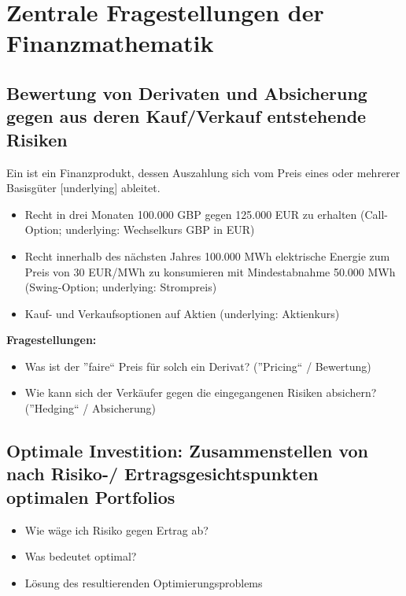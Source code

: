 \section{Zentrale Fragestellungen der Finanzmathematik}

\subsection{Bewertung von Derivaten und Absicherung gegen aus deren Kauf/Verkauf entstehende Risiken}

\begin{definition}[Derivat]
	Ein  ist ein Finanzprodukt, dessen Auszahlung sich vom Preis eines oder mehrerer Basisgüter [underlying] ableitet.
\end{definition}

\begin{beispiel}
	\begin{itemize}[nolistsep, leftmargin=*, topsep=-\parskip]
		\item Recht in drei Monaten 100.000 GBP gegen 125.000 EUR zu erhalten (Call-Option; underlying: Wechselkurs GBP in EUR)
		\item Recht innerhalb des nächsten Jahres 100.000 MWh elektrische Energie zum Preis von 30 EUR/MWh zu konsumieren mit Mindestabnahme 50.000 MWh (Swing-Option; underlying: Strompreis)
		\item Kauf- und Verkaufsoptionen auf Aktien (underlying: Aktienkurs)
	\end{itemize}
\end{beispiel}

\textbf{Fragestellungen:}
\begin{itemize}[nolistsep, label=--, topsep=-\parskip]
	\item Was ist der ''faire`` Preis für solch ein Derivat? (''Pricing`` / Bewertung)
	\item Wie kann sich der Verkäufer gegen die eingegangenen Risiken absichern? (''Hedging`` / Absicherung)
\end{itemize}

\subsection{Optimale Investition: Zusammenstellen von nach Risiko-/ Ertragsgesichtspunkten optimalen Portfolios}

\begin{itemize}[nolistsep, leftmargin=*, topsep=-\parskip]
	\item Wie wäge ich Risiko gegen Ertrag ab?
	\item Was bedeutet optimal?
	\item Lösung des resultierenden Optimierungsproblems
\end{itemize}

